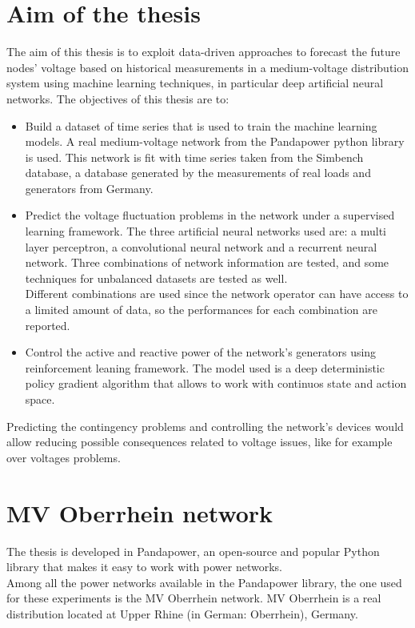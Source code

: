 \section{Aim of the thesis}
The aim of this thesis is to exploit data-driven approaches to forecast the future nodes' voltage based on historical measurements in a medium-voltage distribution system using machine learning techniques, in particular deep artificial neural networks. The objectives of this thesis are to:
\begin{itemize}
    \item Build a dataset of time series that is used to train the machine learning models. A real medium-voltage network from the Pandapower python library is used. This network is fit with time series taken from the Simbench database, a database generated by the measurements of real loads and generators from Germany. 
    \item Predict the voltage fluctuation problems in the network under a supervised learning framework. The three artificial neural networks used are: a multi layer perceptron, a convolutional neural network and a recurrent neural network. Three combinations of network information are tested, and some techniques for unbalanced datasets are tested as well. \\
    Different combinations are used since the network operator can have access to a limited amount of data, so the performances for each combination are reported.
    \item Control the active and reactive power of the network's generators using reinforcement leaning framework. The model used is a deep deterministic policy gradient algorithm that allows to work with continuos state and action space.
\end{itemize}
Predicting the contingency problems and controlling the network's devices would allow reducing possible consequences related to voltage issues, like for example over voltages problems. 

\section{MV Oberrhein network}
The thesis is developed in Pandapower, an open-source and popular Python library that makes it easy to work with power networks.\\
Among all the power networks available in the Pandapower library, the one used for these experiments is the MV Oberrhein network. MV Oberrhein is a real distribution located at Upper Rhine (in German:  Oberrhein),  Germany. 

